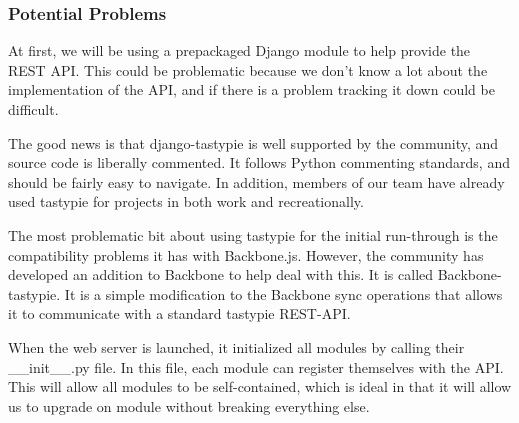 \subsubsection{Potential Problems}

At first, we will be using a prepackaged Django module to help provide the REST API.
This could be problematic because we don't know a lot about the implementation of the API, and if there is a problem tracking it down could be difficult.

The good news is that django-tastypie is well supported by the community, and source code is liberally commented.
It follows Python commenting standards, and should be fairly easy to navigate.
In addition, members of our team have already used tastypie for projects in both work and recreationally.

The most problematic bit about using tastypie for the initial run-through is the compatibility problems it has with Backbone.js.
However, the community has developed an addition to Backbone to help deal with this.
It is called Backbone-tastypie.
It is a simple modification to the Backbone sync operations that allows it to communicate with a standard tastypie REST-API.

When the web server is launched, it initialized all modules by calling their \_\_init\_\_.py file.
In this file, each module can register themselves with the API.
This will allow all modules to be self-contained, which is ideal in that it will allow us to upgrade on module without breaking everything else.
